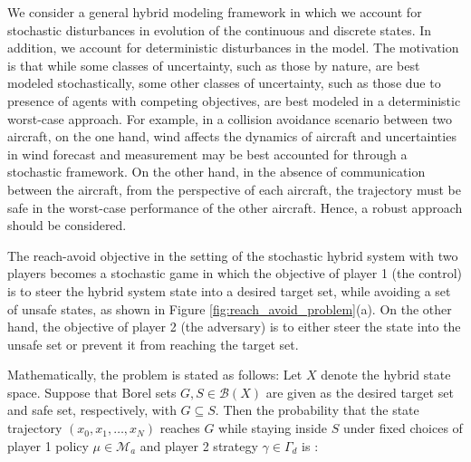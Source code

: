          

                 We consider a general hybrid modeling framework in
                 which we account for stochastic disturbances in
                 evolution of the continuous and discrete states. In
                 addition, we account for deterministic disturbances
                 in the model. The motivation is that while some
                 classes of uncertainty, such as those by nature, are
                 best modeled stochastically, some other classes of
                 uncertainty, such as those due to presence of agents
                 with competing objectives, are best modeled in a
                 deterministic worst-case approach. For example, in a
                 collision avoidance scenario between two aircraft, on
                 the one hand, wind affects the dynamics of aircraft
                 and uncertainties in wind forecast and measurement
                 may be best accounted for through a stochastic
                 framework. On the other hand, in the absence of
                 communication between the aircraft, from the
                 perspective of each aircraft, the trajectory must be
                 safe in the worst-case performance of the other
                 aircraft. Hence, a robust approach should be
                 considered.

                 The reach-avoid objective in the setting of the
                 stochastic hybrid system with two players becomes a
                 stochastic game in which the objective of player 1
                 (the control) is to steer the hybrid system state
                 into a desired target set, while avoiding a set of
                 unsafe states, as shown in Figure
                 \ref{fig:reach_avoid_problem}(a).  On the other hand,
                 the objective of player 2 (the adversary) is to
                 either steer the state into the unsafe set or prevent
                 it from reaching the target set.

                 Mathematically, the problem is stated as follows: Let
                 $X$ denote the hybrid state space. Suppose that Borel
                 sets $G, S \in \mathcal{B}(X)$ are given as the
                 desired target set and safe set, respectively, with
                 $G \subseteq S$.  Then the probability that the state
                 trajectory $(x_0, x_1, \dots, x_N)$ reaches $G$ while
                 staying inside $S$ under fixed choices of player 1
                 policy $\mu \in \mathcal{M}_a$ and player 2 strategy
                 $\gamma \in \Gamma_d$ is \cite{kamgar2011cdc}:

